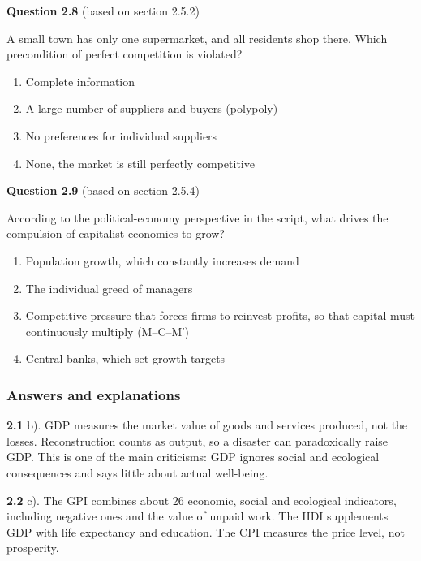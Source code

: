 \documentclass[
  british,
  a4paper,
  DIV=11,
  numbers=noendperiod,
  oneside,
  openany]{scrreprt}
\providecommand{\tightlist}{%
  \setlength{\itemsep}{0pt}\setlength{\parskip}{0pt}}
\begin{document}
\textbf{Question 2.8} (based on section 2.5.2)

A small town has only one supermarket, and all residents shop there.
Which precondition of perfect competition is violated?

\begin{enumerate}
\def\labelenumi{\alph{enumi})}
\tightlist
\item
  Complete information
\item
  A large number of suppliers and buyers (polypoly)
\item
  No preferences for individual suppliers
\item
  None, the market is still perfectly competitive
\end{enumerate}

\textbf{Question 2.9} (based on section 2.5.4)

According to the political-economy perspective in the script, what
drives the compulsion of capitalist economies to grow?

\begin{enumerate}
\def\labelenumi{\alph{enumi})}
\tightlist
\item
  Population growth, which constantly increases demand
\item
  The individual greed of managers
\item
  Competitive pressure that forces firms to reinvest profits, so that
  capital must continuously multiply (M--C--M′)
\item
  Central banks, which set growth targets
\end{enumerate}

\subsubsection*{Answers and
explanations}\label{answers-and-explanations-1}

\textbf{2.1} b). GDP measures the market value of goods and services
produced, not the losses. Reconstruction counts as output, so a disaster
can paradoxically raise GDP. This is one of the main criticisms: GDP
ignores social and ecological consequences and says little about actual
well-being.

\textbf{2.2} c). The GPI combines about 26 economic, social and
ecological indicators, including negative ones and the value of unpaid
work. The HDI supplements GDP with life expectancy and education. The
CPI measures the price level, not prosperity.
\end{document}
